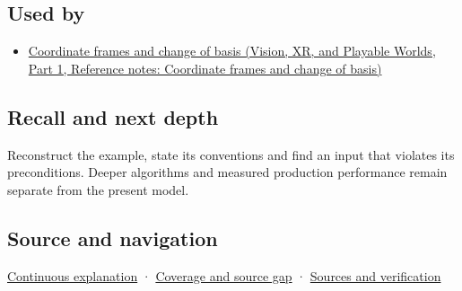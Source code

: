 \subsection{Used by}\label{appendix-48d2e66378ab-used-by}

\hypertarget{appendix-48d2e66378ab-used-by}{}

\begin{itemize}
\tightlist
\item
  \href{../07-Vision-XR-and-Playable-Worlds-P01/main.pdf\#nameddest=appendix-1bae9457dbc3}{Coordinate frames and change of basis (Vision, XR, and Playable Worlds, Part 1, Reference notes: Coordinate frames and change of basis)}
\end{itemize}

\subsection{Recall and next depth}\label{appendix-48d2e66378ab-recall-and-next-depth}

\hypertarget{appendix-48d2e66378ab-recall-and-next-depth}{}

Reconstruct the example, state its conventions and find an input that violates its preconditions. Deeper algorithms and measured production performance remain separate from the present model.

\subsection{Source and navigation}\label{appendix-48d2e66378ab-source-and-navigation}

\hypertarget{appendix-48d2e66378ab-source-and-navigation}{}

\hyperref[01-foundations-i-ch018-keep-the-promises-visible-while-moving-between-representations]{Continuous explanation} · \hyperref[appendix-fd090d982a15-phase-7---parts-601-700]{Coverage and source gap} · \hyperref[appendix-a103e7846d21-phase-7---source-analysis-and-verification]{Sources and verification}
